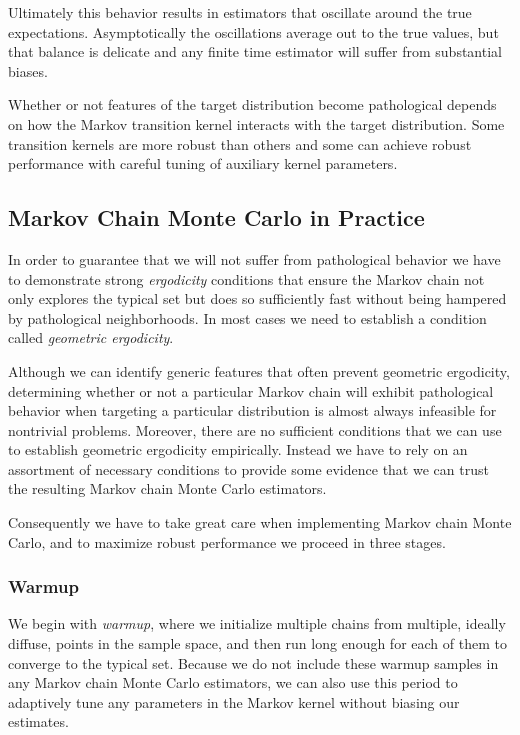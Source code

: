Ultimately this behavior results in estimators that oscillate 
around the true expectations.  Asymptotically the oscillations
average out to the true values, but that balance is delicate and
any finite time estimator will suffer from substantial biases.

Whether or not features of the target distribution become
pathological depends on how the Markov transition kernel
interacts with the target distribution.  Some transition kernels
are more robust than others and some can achieve robust
performance with careful tuning of auxiliary kernel parameters.
 
\subsection{Markov Chain Monte Carlo in Practice}

In order to guarantee that we will not suffer from pathological
behavior we have to demonstrate strong \emph{ergodicity}
conditions that ensure the Markov chain not only explores
the typical set but does so sufficiently fast without being
hampered by pathological neighborhoods.  In most cases
we need to establish a condition called \emph{geometric 
ergodicity}.

Although we can identify generic features that often prevent
geometric ergodicity, determining whether or not a particular
Markov chain will exhibit pathological behavior when 
targeting a particular distribution is almost always infeasible
for nontrivial problems.  Moreover, there are no sufficient
conditions that we can use to establish geometric ergodicity
empirically.  Instead we have to rely on an assortment of 
necessary conditions to provide some evidence that we can 
trust the resulting Markov chain Monte Carlo estimators.

Consequently we have to take great care when implementing
Markov chain Monte Carlo, and to maximize robust performance
we proceed in three stages.

\subsubsection{Warmup}

We begin with \emph{warmup}, where we initialize multiple
chains from multiple, ideally diffuse, points in the sample space,
and then run long enough for each of them to converge to the 
typical set.  Because we do not include these warmup samples 
in any Markov chain Monte Carlo estimators, we can also use 
this period to adaptively tune any parameters in the Markov 
kernel without biasing our estimates.

